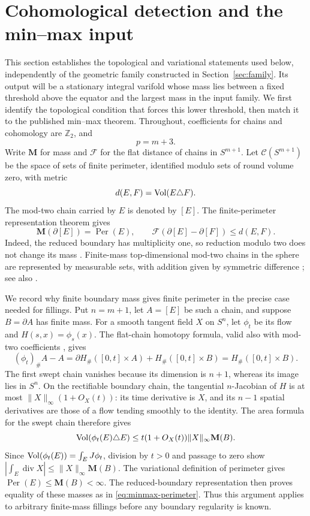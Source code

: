 \section{Cohomological detection and the min--max input}\label{sec:minmax}

This section establishes the topological and variational statements used
below, independently of the geometric family constructed in
Section~\ref{sec:family}. Its output will be a stationary integral
varifold whose mass lies between a fixed threshold above the equator
and the largest mass in the input family. We first identify the
topological condition that forces this lower threshold, then match it
to the published min--max theorem. Throughout, coefficients for chains and
cohomology are $\mathbb Z_2$, and
\[
 p=m+3.
\]
Write $\mathbf M$ for mass and $\mathcal F$ for the flat distance of
chains in $S^{m+1}$. Let $\mathcal C(S^{m+1})$ be the space of sets of
finite perimeter, identified modulo sets of round volume zero, with metric
\[
 d(E,F)=\operatorname{Vol}(E\triangle F).
\]
The mod-two chain carried by $E$ is denoted by $[E]$. The
finite-perimeter representation theorem gives
\begin{equation}\label{eq:minmax-perimeter}
 \mathbf M(\partial[E])=\operatorname{Per}(E),\qquad
 \mathcal F(\partial[E]-\partial[F])\le d(E,F).
\end{equation}
Indeed, the reduced boundary has multiplicity one, so reduction modulo
two does not change its mass \cite[\S2.2]{BDFSphere}.
Finite-mass top-dimensional mod-two chains in the sphere are represented
by measurable sets, with addition given by symmetric difference
\cite[\S7, pp.~317--318]{Federer1978}; see also
\cite[\S\S2.1--2.3 and Appendix]{White2009}.

We record why finite boundary mass gives finite perimeter in the precise
case needed for fillings. Put \(n=m+1\), let \(A=[E]\) be such a chain,
and suppose \(B=\partial A\) has finite mass. For a smooth tangent field
\(X\) on \(S^n\), let \(\phi_t\) be its flow and
\(H(s,x)=\phi_s(x)\). The flat-chain homotopy formula, valid also with
mod-two coefficients \cite[\S6.2, Lemma~6.4]{WhiteGMT}, gives
\[
 (\phi_t)_\#A-A
 =\partial H_\#([0,t]\times A)+H_\#([0,t]\times B)
 =H_\#([0,t]\times B).
\]
The first swept chain vanishes because its dimension is \(n+1\),
whereas its image lies in \(S^n\). On the rectifiable boundary chain,
the tangential \(n\)-Jacobian of \(H\) is at most
\(\|X\|_\infty(1+O_X(t))\): its time derivative is \(X\), and its
\(n-1\) spatial derivatives are those of a flow tending smoothly to the
identity. The area formula for the swept chain therefore gives
\[
 \operatorname{Vol}(\phi_t(E)\triangle E)
 \le t(1+O_X(t))\|X\|_\infty\mathbf M(B).
\]
Since \(\operatorname{Vol}(\phi_t(E))=\int_E J\phi_t\), division by \(t>0\) and
passage to zero show
\(\left|\int_E\operatorname{div}X\right|
 \le\|X\|_\infty\mathbf M(B)\).
The variational definition of perimeter gives
\(\operatorname{Per}(E)\le\mathbf M(B)<\infty\).
The reduced-boundary representation then proves equality of these
masses as in \eqref{eq:minmax-perimeter}. Thus this argument applies to
arbitrary finite-mass fillings before any boundary regularity is known.

